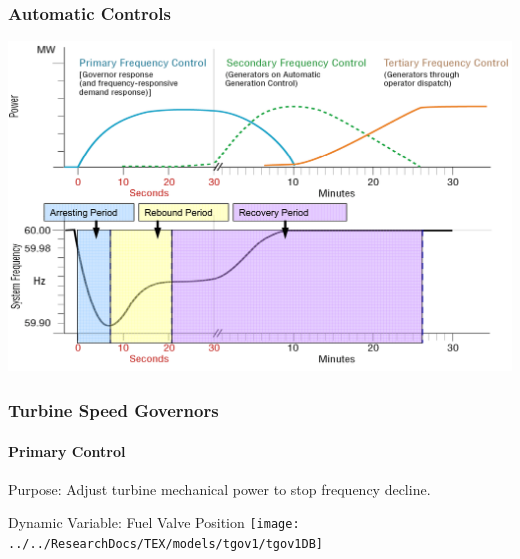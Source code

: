 \documentclass[14pt, unknownkeysallowed]{beamer}
\begin{document}
\begin{frame}
\frametitle{Automatic Controls}
\begin{center}
\includegraphics[height=.82\textheight]{ctrlReactionFlip} {\tiny\cite{ctrlTimeScale}}%
\end{center}
\end{frame}
\begin{frame}
\frametitle{Turbine Speed Governors}
\framesubtitle{Primary Control}

Purpose: Adjust turbine mechanical power to stop frequency decline.\\
\vspace{.5em}

Dynamic Variable: Fuel Valve Position 
{\centering\texttt{[image: ../../ResearchDocs/TEX/models/tgov1/tgov1DB]}}

\end{frame}
\end{document}
